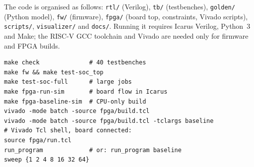 \documentclass[10pt,twocolumn,a4paper]{article}
\begin{document}
The code is organised as follows: \texttt{rtl/} (Verilog), \texttt{tb/}
(testbenches), \texttt{golden/} (Python model), \texttt{fw/} (firmware),
\texttt{fpga/} (board top, constraints, Vivado scripts), \texttt{scripts/},
\texttt{visualizer/} and \texttt{docs/}. Running it requires Icarus Verilog,
Python~3 and Make; the RISC-V GCC toolchain and Vivado are needed only for
firmware and FPGA builds.
\begin{lstlisting}
make check              # 40 testbenches
make fw && make test-soc_top
make test-soc-full      # large jobs
make fpga-run-sim       # board flow in Icarus
make fpga-baseline-sim  # CPU-only build
vivado -mode batch -source fpga/build.tcl
vivado -mode batch -source fpga/build.tcl -tclargs baseline
# Vivado Tcl shell, board connected:
source fpga/run.tcl
run_program             # or: run_program baseline
sweep {1 2 4 8 16 32 64}
\end{lstlisting}
\end{document}
